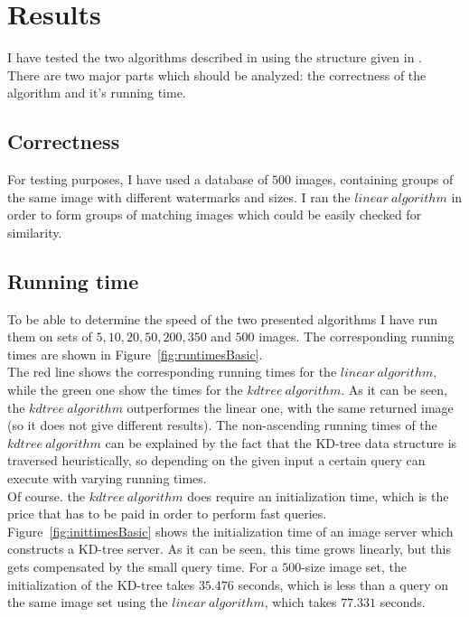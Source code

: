 \chapter{Results}

I have tested the two algorithms described in  using the structure given in .\\
There are two major parts which should be analyzed: the correctness of the algorithm and it's running time.

\section{Correctness}

For testing purposes, I have used a database of $500$ images, containing groups of the same image with different watermarks and sizes. I ran the $linear\ algorithm$ in order to form groups of matching images which could be easily checked for similarity. \\

\section{Running time}

To be able to determine the speed of the two presented algorithms I have run them on sets of $5, 10, 20, 50, 200, 350$ and $500$ images. The corresponding running times are shown in Figure~\ref{fig:runtimesBasic}.\\
The red line shows the corresponding running times for the $linear\ algorithm$, while the green one show the times for the $kdtree\ algorithm$. As it can be seen, the $kdtree\ algorithm$ outperformes the linear one, with the same returned image (so it does not give different results). The non-ascending running times of the $kdtree\ algorithm$ can be explained by the fact that the KD-tree data structure is traversed heuristically, so depending on the given input a certain query can execute with varying running times. \\
Of course. the $kdtree\ algorithm$ does require an initialization time, which is the price that has to be paid in order to perform fast queries. Figure~\ref{fig:inittimesBasic} shows the initialization time of an image server which constructs a KD-tree server. As it can be seen, this time grows linearly, but this gets compensated by the small query time. For a $500$-size image set, the initialization of the KD-tree takes $35.476$ seconds, which is less than a query on the same image set using the $linear\ algorithm$, which takes $77.331$ seconds.

